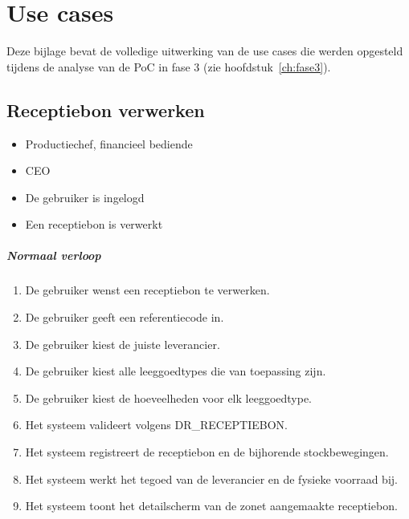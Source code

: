 \chapter{Use cases}
\label{ch:bijlage-usecases}

Deze bijlage bevat de volledige uitwerking van de use cases die werden opgesteld tijdens de analyse van de PoC in fase 3 (zie hoofdstuk~\ref{ch:fase3}).

\section{Receptiebon verwerken}
\label{uc:receptiebon-verwerken}

    \vspace{0.5em}

    \begin{itemize}[leftmargin=3.5cm, labelsep=0.5cm, nosep]
        \item[\textbf{Primaire actor:}] Productiechef, financieel bediende
        \item[\textbf{Stakeholders:}] CEO
        \item[\textbf{Precondities:}] De gebruiker is ingelogd
        \item[\textbf{Postcondities:}] Een receptiebon is verwerkt
    \end{itemize}

    \paragraph{Normaal verloop}
    \begin{enumerate}[nosep]
        \item De gebruiker wenst een receptiebon te verwerken.
        \item De gebruiker geeft een referentiecode in.
        \item De gebruiker kiest de juiste leverancier.
        \item De gebruiker kiest alle leeggoedtypes die van toepassing zijn.
        \item De gebruiker kiest de hoeveelheden voor elk leeggoedtype.
        \item Het systeem valideert volgens DR\_RECEPTIEBON.
        \item Het systeem registreert de receptiebon en de bijhorende stockbewegingen.
        \item Het systeem werkt het tegoed van de leverancier en de fysieke voorraad bij.
        \item Het systeem toont het detailscherm van de zonet aangemaakte receptiebon.
    \end{enumerate}

